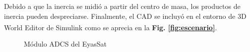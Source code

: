 Debido a que la inercia se midió a partir del centro de masa, los productos de inercia pueden despreciarse. Finalmente, el CAD se incluyó en el entorno de 3D World Editor de Simulink\textsuperscript{\tiny\textregistered} como se aprecia en la \textbf{Fig. \ref{fig:escenario}}.


\begin{figure}[h!]
	\centering
	
	\caption{Módulo ADCS del EyasSat}
	\label{fig:mediciones}
\end{figure}


